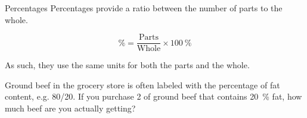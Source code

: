 \documentclass[notes=hide]{beamer}
\begin{document}

\begin{frame}[t]{Percentages}
	Percentages provide a \alert{ratio} between the number of parts to the
	whole.

	\begin{equation*}
		\si{\percent} = \frac{\text{Parts}}{\text{Whole}} \times \SI{100}{\percent}
	\end{equation*}

	As such, they use the same units for both the parts and the whole.
	\begin{example}
		Ground beef in the grocery store is often labeled with the
		percentage of fat content, e.g. 80/20. If you purchase
		\SI{2}{\pound} of ground beef that contains \SI{20}{\percent}
		fat, how much beef are you actually getting?
	\end{example}
\end{frame}
\end{document}
